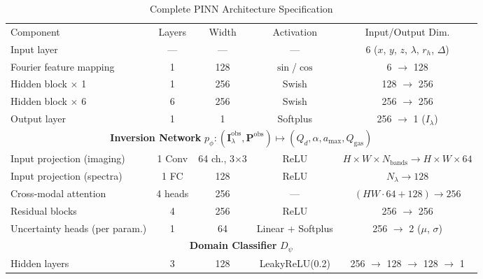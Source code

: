 \documentclass[usenatbib]{mnras}
\begin{document}
\begin{table}
\centering
\caption{Complete PINN Architecture Specification}\label{tab:pinn_arch}
\begin{tabular}{lcccc}
\toprule
Component & Layers & Width & Activation & Input/Output Dim.
\midrule
\multicolumn{5}{c}{\textbf{Physics-Informed Neural Network (PINN)} $u_\theta: (\mathbf{r}, \lambda, r_h, \Delta) \mapsto I_\lambda$} \\
\hspace{1em}Input layer & --- & --- & --- & 6 ($x$, $y$, $z$, $\lambda$, $r_h$, $\Delta$) \\
\hspace{1em}Fourier feature mapping & 1 & 128 & $\sin$/$\cos$ & 6 $\to$ 128 \\
\hspace{1em}Hidden block $\times$ 1 & 1 & 256 & Swish & 128 $\to$ 256 \\
\hspace{1em}Hidden block $\times$ 6 & 6 & 256 & Swish & 256 $\to$ 256 \\
\hspace{1em}Output layer & 1 & 1 & Softplus & 256 $\to$ 1 ($I_\lambda$) \\
\multicolumn{5}{c}{\textbf{Inversion Network} $p_\phi: (\mathbf{I}_\lambda^{\text{obs}}, \mathbf{P}^{\text{obs}}) \mapsto (Q_d, \alpha, a_{\max}, Q_{\text{gas}})$} \\
\hspace{1em}Input projection (imaging) & 1 Conv & 64 ch., 3$\times$3 & ReLU & $H \times W \times N_{\text{bands}} \to H \times W \times 64$ \\
\hspace{1em}Input projection (spectra) & 1 FC & 128 & ReLU & $N_\lambda \to 128$ \\
\hspace{1em}Cross-modal attention & 4 heads & 256 & --- & $(HW\cdot64 + 128) \to 256$ \\
\hspace{1em}Residual blocks & 4 & 256 & ReLU & 256 $\to$ 256 \\
\hspace{1em}Uncertainty heads (per param.) & 1 & 64 & Linear + Softplus & 256 $\to$ 2 ($\mu$, $\sigma$) \\
\multicolumn{5}{c}{\textbf{Domain Classifier} $D_\psi$} \\
\hspace{1em}Hidden layers & 3 & 128 & LeakyReLU(0.2) & 256 $\to$ 128 $\to$ 128 $\to$ 1 \\

\end{tabular}
\end{table}
\end{document}

